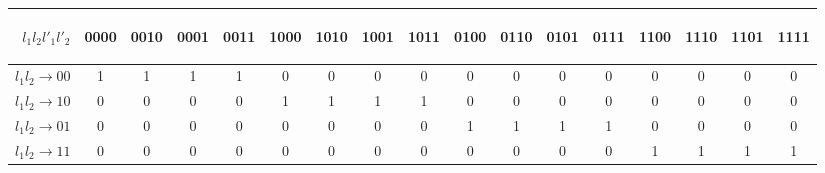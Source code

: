 \begin{table}
\centering
\begin{tabular}{ r || c | c | c | c | c | c | c | c | c | c | c | c | c | c | c | c }
		\begin{sideways}$l_1 l_2 l'_1 l'_2$\end{sideways} &	\begin{sideways}0000\end{sideways} & \begin{sideways}0010\end{sideways} & \begin{sideways}0001\end{sideways} & \begin{sideways}0011\end{sideways}	
			  & \begin{sideways}1000\end{sideways} & \begin{sideways}1010\end{sideways} & \begin{sideways}1001\end{sideways} & \begin{sideways}1011\end{sideways} 
			  &	\begin{sideways}0100\end{sideways} & \begin{sideways}0110\end{sideways} & \begin{sideways}0101\end{sideways} & \begin{sideways}0111\end{sideways}
			  &	\begin{sideways}1100\end{sideways} & \begin{sideways}1110\end{sideways} & \begin{sideways}1101\end{sideways} & \begin{sideways}1111\end{sideways}\\ \hline \hline
    $l_1 l_2 \rightarrow 00$ & 1 & 1 & 1 & 1 & 0 & 0 & 0 & 0 & 0 & 0 & 0 & 0 & 0 & 0 & 0 & 0\\ \hline
    $l_1 l_2 \rightarrow 10$ & 0 & 0 & 0 & 0 & 1 & 1 & 1 & 1 & 0 & 0 & 0 & 0 & 0 & 0 & 0 & 0\\ \hline
    $l_1 l_2 \rightarrow 01$ & 0 & 0 & 0 & 0 & 0 & 0 & 0 & 0 & 1 & 1 & 1 & 1 &  0 & 0 & 0 & 0\\ \hline
    $l_1 l_2 \rightarrow 11$ & 0 & 0 & 0 & 0 & 0 & 0 & 0 & 0 & 0 & 0 & 0 & 0 & 1 & 1 & 1 & 1\\ \hline


\end{tabular}
\end{table}
